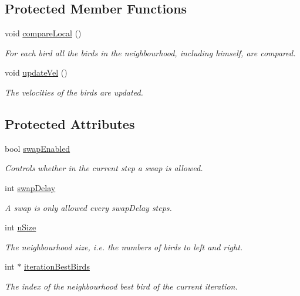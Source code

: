 \subsection*{Protected Member Functions}
\begin{CompactItemize}
\item 
void \hyperlink{classLocalSwarm_86d8eca005f9925ef63433503476d7ff}{compareLocal} ()
\begin{CompactList}\small\item\em For each bird all the birds in the neighbourhood, including himself, are compared. \item\end{CompactList}\item 
void \hyperlink{classLocalSwarm_08e4a17b8b74ff1c4da77975140613e7}{updateVel} ()
\begin{CompactList}\small\item\em The velocities of the birds are updated. \item\end{CompactList}\end{CompactItemize}
\subsection*{Protected Attributes}
\begin{CompactItemize}
\item 
bool \hyperlink{classLocalSwarm_ee2611a28517a417e7165f68b2d994d2}{swapEnabled}
\begin{CompactList}\small\item\em Controls whether in the current step a swap is allowed. \item\end{CompactList}\item 
int \hyperlink{classLocalSwarm_18972161a1402048e67aa08b526ce7dc}{swapDelay}
\begin{CompactList}\small\item\em A swap is only allowed every swapDelay steps. \item\end{CompactList}\item 
int \hyperlink{classLocalSwarm_a9277a2e88b83081d3ee8338c856eaeb}{nSize}
\begin{CompactList}\small\item\em The neighbourhood size, i.e. the numbers of birds to left and right. \item\end{CompactList}\item 
int $\ast$ \hyperlink{classLocalSwarm_6364776b43399f20b45a2f795937bde0}{iterationBestBirds}
\begin{CompactList}\small\item\em The index of the neighbourhood best bird of the current iteration. \item\end{CompactList}\end{CompactItemize}


